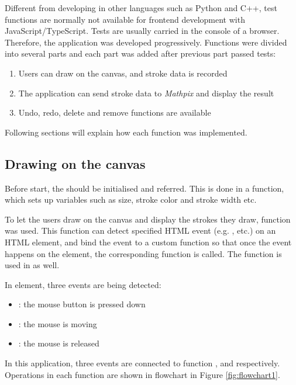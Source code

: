 \documentclass[12pt,twoside]{report}
\begin{document}
Different from developing in other languages such as Python and C++, test
functions are normally not available for frontend development with
JavaScript/TypeScript. Tests are usually carried in the console of a browser. Therefore, the application was developed progressively. Functions were divided into several parts and each part was added after previous part passed tests:
\begin{enumerate}
    \item Users can draw on the canvas, and stroke data is recorded
    \item The application can send stroke data to \textit{Mathpix} and display the result
    \item Undo, redo, delete and remove functions are available
\end{enumerate}

Following sections will explain how each function was implemented.

\subsection{Drawing on the canvas}
Before start, the  should be initialised and referred. This is done in a  function, which sets up variables such as size, stroke color and stroke width etc.

To let the users draw on the canvas and display the strokes they draw, function
 was used. This function can detect specified HTML event
(e.g. ,  etc.) on an HTML element, and bind the
event to a custom function so that once the event happens on the element, the
corresponding function is called. The function is used in  as well.

In  element, three events are being detected: 
\begin{itemize}
    \item {}: the mouse button is pressed down
    \item {}: the mouse is moving
    \item {}: the mouse is released
\end{itemize}

In this application, three events are connected to function
,  and 
respectively. Operations in each function are shown in flowchart in Figure
\ref{fig:flowchart1}.
\end{document}
